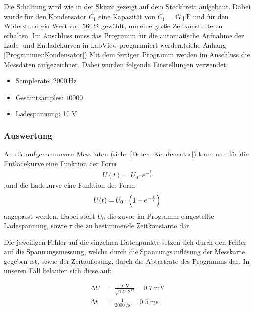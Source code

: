 \documentclass[12pt,twoside,a4paper]{scrartcl}
\begin{document}
				Die Schaltung wird wie in der Skizze gezeigt auf dem Steckbrett aufgebaut. Dabei wurde für den Kondensator $C_1$ eine Kapazität von $C_1 = \SI{47}{\micro \farad}$ und für den Widerstand ein Wert von $\SI{560}{\ohm}$ gewählt, um eine große Zeitkonstante zu erhalten. Im Anschluss muss das Programm für die automatische Aufnahme der Lade- und Entladekurven in LabView progammiert werden.(siehe Anhang \ref{Programme::Kondensator}) Mit dem fertigen Programm werden im Anschluss die Messdaten aufgezeichnet. Dabei wurden folgende Einstellungen verwendet:

				\begin{itemize}
					\item Samplerate: $\SI{2000}{\hertz}$
					\item Gesamtsamples: $ 10000 $
					\item Ladespannung: 10 V
				\end{itemize}

			\subsubsection{Auswertung}

				An die aufgenommenen Messdaten (siehe \ref{Daten::Kondensator}) kann nun für die Entladekurve eine Funktion der Form
				\begin{align*}
					U(t) = U_0 \cdot e^{-\frac{t}{\tau}}
				\end{align*}
				,und die Ladekurve eine Funktion der Form
				\begin{align*}
					U(t) = U_0 \cdot \qty(1-e^{-\frac{t}{\tau}})
				\end{align*}
				angepasst werden. Dabei stellt $U_0$ die zuvor im Programm eingestellte Ladespannung, sowie $\tau$ die zu bestimmende Zeitkonstante dar.

				Die jeweiligen Fehler auf die einzelnen Datenpunkte setzen sich durch den Fehler auf die Spannungsmessung, welche durch die Spannungsauflösung der Messkarte gegeben ist, sowie der Zeitauflösung, durch die Abtastrate des Programms dar. In unseren Fall belaufen sich diese auf:

				\begin{align}
					\label{Kondensator::Messfehler}
					\Delta U &= \frac{\SI{10}{\volt}}{\sqrt{12} \cdot 2^{12}} = \SI{0.7}{\milli \volt} \\
					\Delta t &= \frac{1}{\SI{2000}{\per \second}} =  \SI{0.5}{\milli \second} %
				\end{align}
\end{document}
